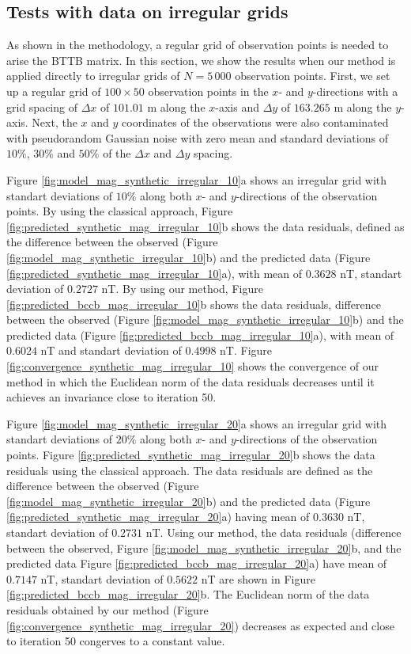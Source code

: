 \subsection*{Tests with data on irregular grids}

As shown in the methodology, a regular grid of observation points is needed to arise the BTTB matrix. In this section, we show the results when our method is applied directly to irregular grids of $N = 5 \, 000$ observation points. 
First, we set up a regular grid of $100 \times 50$ observation points in the $x$- and $y$-directions with a grid spacing of $\Delta x$ of $101.01$ m along the $x$-axis and $\Delta y$ of
$163.265$ m along the $y$-axis. Next, the $x$ and $y$ coordinates of the observations were also contaminated with pseudorandom Gaussian noise with zero mean and standard deviations of $10\%$, $30\%$ and $50\%$ of the 
$\Delta x$ and $\Delta y$ spacing.

Figure \ref{fig:model_mag_synthetic_irregular_10}a shows an irregular grid with standart deviations of $10\%$ along both $x$- and $y$-directions of the observation points. 
By using the classical approach, Figure \ref{fig:predicted_synthetic_mag_irregular_10}b shows the data residuals,  defined as the difference between the observed  (Figure \ref{fig:model_mag_synthetic_irregular_10}b) and the predicted data (Figure \ref{fig:predicted_synthetic_mag_irregular_10}a), with mean of $0.3628$ nT, standart deviation of $0.2727$ nT. 
By using our method, Figure \ref{fig:predicted_bccb_mag_irregular_10}b shows the data residuals, difference between the observed (Figure \ref{fig:model_mag_synthetic_irregular_10}b) and the predicted data (Figure \ref{fig:predicted_bccb_mag_irregular_10}a), with mean of $0.6024$ nT and standart deviation of $0.4998$ nT.
Figure \ref{fig:convergence_synthetic_mag_irregular_10} shows the convergence of our method in which the Euclidean norm of the data residuals decreases until it achieves an invariance close to iteration 50. 

Figure \ref{fig:model_mag_synthetic_irregular_20}a shows an irregular grid with standart deviations of $20\%$ along both $x$- and $y$-directions of the observation points. 
Figure \ref{fig:predicted_synthetic_mag_irregular_20}b shows the data residuals 
using the classical approach.
The data residuals are defined as the difference between the observed 
(Figure \ref{fig:model_mag_synthetic_irregular_20}b) and the predicted data 
(Figure \ref{fig:predicted_synthetic_mag_irregular_20}a) having mean of $0.3630$ nT, standart deviation of $0.2731$ nT. 
Using our method, the data residuals (difference between the observed, 
Figure \ref{fig:model_mag_synthetic_irregular_20}b, and the predicted data 
Figure \ref{fig:predicted_bccb_mag_irregular_20}a)  
have mean of  $0.7147$ nT, standart deviation of $0.5622$ nT are  shown in 
Figure \ref{fig:predicted_bccb_mag_irregular_20}b.
The  Euclidean norm of the data residuals obtained by our method (Figure \ref{fig:convergence_synthetic_mag_irregular_20}) decreases as expected and close to iteration 50 congerves to a constant value. 

